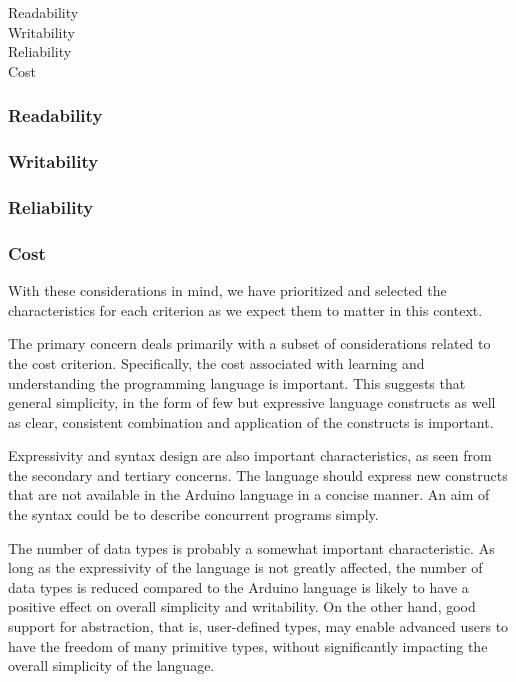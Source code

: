
\begin{description}
\item[Readability] 
\item[Writability] 
\item[Reliability] 
\item[Cost] 
\end{description}

\subsubsection{Readability}


\subsubsection{Writability}


\subsubsection{Reliability}


\subsubsection{Cost}



With these considerations in mind, we have prioritized and selected the characteristics for each criterion as we expect them to matter in this context.

The primary concern deals primarily with a subset of considerations related to the cost criterion. Specifically, the cost associated with learning and understanding the programming language is important. This suggests that general simplicity, in the form of few but expressive language constructs as well as clear, consistent combination and application of the constructs is important.

Expressivity and syntax design are also important characteristics, as seen from the secondary and tertiary concerns. The language should express new constructs that are not available in the Arduino language in a concise manner. An aim of the syntax could be to describe concurrent programs simply.

The number of data types is probably a somewhat important characteristic. As long as the expressivity of the language is not greatly affected, the number of data types is reduced  compared to the Arduino language is likely to have a positive effect on overall simplicity and writability. On the other hand, good support for abstraction, that is, user-defined types, may enable advanced users to have the freedom of many primitive types, without significantly impacting the overall simplicity of the language. 

